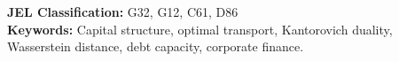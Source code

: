 \documentclass[12pt]{article}
\theoremstyle{definition}
\theoremstyle{remark}
\begin{document}
\vspace{6pt}
\noindent \textbf{JEL Classification:} G32, G12, C61, D86 \\
\noindent \textbf{Keywords:} Capital structure, optimal transport, Kantorovich duality, Wasserstein distance, debt capacity, corporate finance.

\newpage
\tableofcontents
\newpage









\appendix





\end{document}
